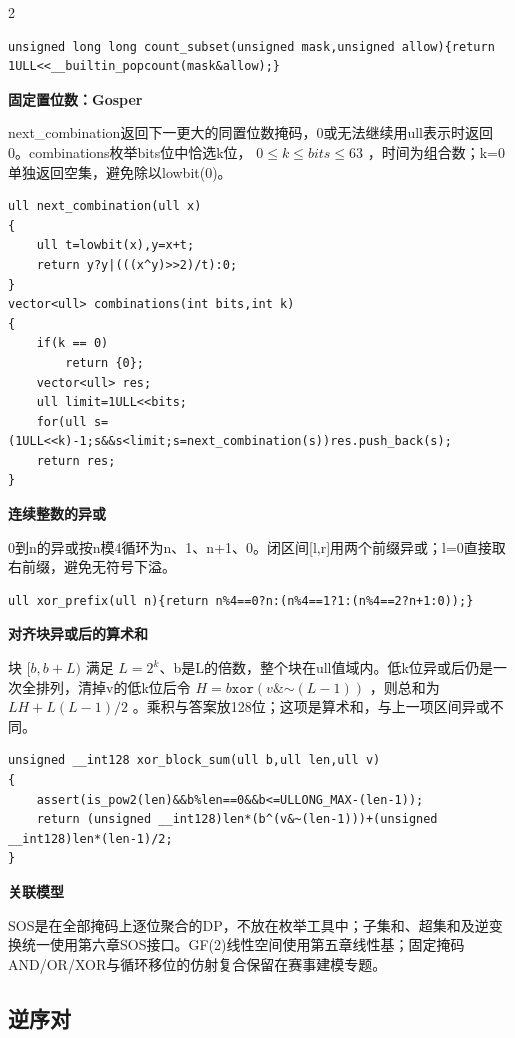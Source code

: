 \documentclass[UTF8,fontset=fandol,a4paper,twoside]{ctexart}
\newcommand{\topic}[1]{\par\smallskip\textbf{#1}\par\nobreak}
\newcommand{\note}[1]{{\fontsize{10}{12}\selectfont #1\par}}
\begin{document}
\begin{multicols}{2}
\begin{lstlisting}
unsigned long long count_subset(unsigned mask,unsigned allow){return 1ULL<<__builtin_popcount(mask&allow);}
\end{lstlisting}
\topic{固定置位数：Gosper}
\note{next\_combination返回下一更大的同置位数掩码，0或无法继续用ull表示时返回0。combinations枚举bits位中恰选k位， $0\le k\le bits\le63$ ，时间为组合数；k=\allowbreak{}0单独返回空集，避免除以lowbit(\allowbreak{}0)\allowbreak{}。}
\begin{lstlisting}
ull next_combination(ull x)
{
    ull t=lowbit(x),y=x+t;
    return y?y|(((x^y)>>2)/t):0;
}
vector<ull> combinations(int bits,int k)
{
    if(k == 0)
        return {0};
    vector<ull> res;
    ull limit=1ULL<<bits;
    for(ull s=(1ULL<<k)-1;s&&s<limit;s=next_combination(s))res.push_back(s);
    return res;
}
\end{lstlisting}
\topic{连续整数的异或}
\note{0到n的异或按n模4循环为n、1、n+\allowbreak{}1、0。闭区间[\allowbreak{}l,\allowbreak{}r]\allowbreak{}用两个前缀异或；l=\allowbreak{}0直接取右前缀，避免无符号下溢。}
\begin{lstlisting}
ull xor_prefix(ull n){return n%4==0?n:(n%4==1?1:(n%4==2?n+1:0));}
\end{lstlisting}
\topic{对齐块异或后的算术和}
\note{块 $[b,b+L)$ 满足 $L=2^k$、b是L的倍数，整个块在ull值域内。低k位异或后仍是一次全排列，清掉v的低k位后令 $H=b\mathbin{\mathtt{xor}}(v\mathbin{\mathtt{\&}}\mathord{\sim}(L-1))$ ，则总和为 $LH+L(L-1)/2$ 。乘积与答案放128位；这项是算术和，与上一项区间异或不同。}
\begin{lstlisting}
unsigned __int128 xor_block_sum(ull b,ull len,ull v)
{
    assert(is_pow2(len)&&b%len==0&&b<=ULLONG_MAX-(len-1));
    return (unsigned __int128)len*(b^(v&~(len-1)))+(unsigned __int128)len*(len-1)/2;
}
\end{lstlisting}
\topic{关联模型}
\note{SOS是在全部掩码上逐位聚合的DP，不放在枚举工具中；子集和、超集和及逆变换统一使用第六章SOS接口。GF(\allowbreak{}2)\allowbreak{}线性空间使用第五章线性基；固定掩码AND/\allowbreak{}OR/\allowbreak{}XOR与循环移位的仿射复合保留在赛事建模专题。}
\subsection{逆序对}


\end{multicols}
\end{document}

